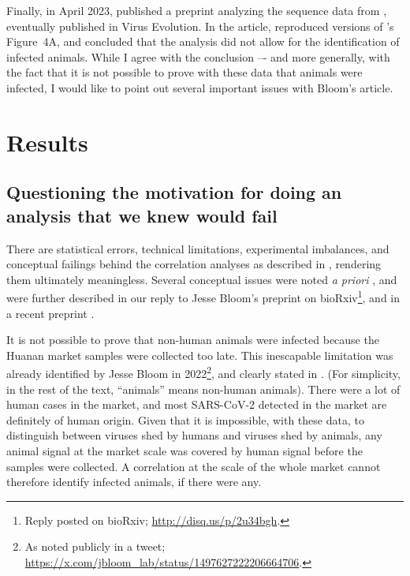 \documentclass[11pt]{article}
\def \sct {\mbox{SARS-CoV-2}}
\begin{document}
Finally, in April 2023, \citet{Bloom2023bioRxiv} published a preprint analyzing the sequence data from \citet{Liu2023Nature}, eventually published in Virus Evolution. In the article, \citet{Bloom2023VE} reproduced versions of \citet{Liu2022RS}'s Figure~4A, and concluded that the analysis did not allow for the identification of infected animals. While I agree with the conclusion –- and more generally, with the fact that it is not possible to prove with these data that animals were infected, I would like to point out several important issues with Bloom's article. 

\section{Results}

\subsection{Questioning the motivation for doing an analysis that we knew would fail}

There are statistical errors, technical limitations, experimental imbalances, and conceptual failings behind the correlation analyses as described in \citet{Bloom2023VE}, rendering them ultimately meaningless. Several conceptual issues were noted \textit{a priori} \citep{ACC2023Zenodo}, and were further described in our reply to Jesse Bloom's preprint on bioRxiv\footnote{\label{foot:reply}Reply posted on bioRxiv; \url{http://disq.us/p/2u34bgh}.}, and in a recent preprint \citep{ACC2023bioRxiv}. 

It is not possible to prove that non-human animals were infected because the Huanan market samples were collected too late. This inescapable limitation was already identified by Jesse Bloom in 2022\footnote{As noted publicly in a tweet; \url{https://x.com/jbloom_lab/status/1497627222206664706}.}, and clearly stated in \citet{Bloom2023VE}. (For simplicity, in the rest of the text, ``animals'' means non-human animals). There were a lot of human cases in the market, and most \sct{} detected in the market are definitely of human origin. Given that it is impossible, with these data, to distinguish between viruses shed by humans and viruses shed by animals, any animal signal at the market scale was covered by human signal before the samples were collected. A correlation at the scale of the whole market cannot therefore identify infected animals, if there were any.
\end{document}
